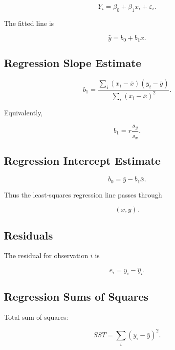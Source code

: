 \[
\boxed{
Y_i
=
\beta_0
+
\beta_1x_i
+
\varepsilon_i.
}
\]

The fitted line is

\[
\boxed{
\hat y
=
b_0+b_1x.
}
\]

\subsection{Regression Slope Estimate}
\label{subsec:regression-slope-estimate}

\[
\boxed{
b_1
=
\frac{
\sum_i
(x_i-\bar{x})
(y_i-\bar{y})
}{
\sum_i
(x_i-\bar{x})^2
}.
}
\]

Equivalently,

\[
\boxed{
b_1
=
r
\frac{
s_y
}{
s_x
}.
}
\]

\subsection{Regression Intercept Estimate}
\label{subsec:regression-intercept-estimate}

\[
\boxed{
b_0
=
\bar{y}
-
b_1\bar{x}.
}
\]

Thus the least-squares regression line passes through

\[
\boxed{
(\bar{x},\bar{y}).
}
\]

\subsection{Residuals}
\label{subsec:residual-reference}

The residual for observation \(i\) is

\[
\boxed{
e_i
=
y_i-\hat y_i.
}
\]

\subsection{Regression Sums of Squares}
\label{subsec:regression-sums-squares}

Total sum of squares:

\[
\boxed{
SST
=
\sum_i
(y_i-\bar y)^2.
}
\]


